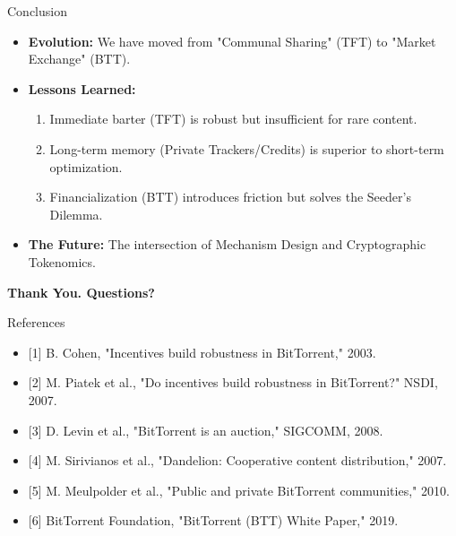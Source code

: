 \documentclass[aspectratio=169]{beamer}
\begin{document}
\begin{frame}{Conclusion}
    \begin{itemize}
        \item \textbf{Evolution:} We have moved from "Communal Sharing" (TFT) to "Market Exchange" (BTT).
        \item \textbf{Lessons Learned:}
        \begin{enumerate}
            \item Immediate barter (TFT) is robust but insufficient for rare content.
            \item Long-term memory (Private Trackers/Credits) is superior to short-term optimization.
            \item Financialization (BTT) introduces friction but solves the Seeder's Dilemma.
        \end{enumerate}
        \item \textbf{The Future:} The intersection of Mechanism Design and Cryptographic Tokenomics.
    \end{itemize}
    
    \vspace{1cm}
    \centering
    \Large \textbf{Thank You. Questions?}
\end{frame}

\begin{frame}[allowframebreaks]{References}
    
    \tiny
    \begin{itemize}
        \item {[1]} B. Cohen, "Incentives build robustness in BitTorrent," 2003.
        \item {[2]} M. Piatek et al., "Do incentives build robustness in BitTorrent?" NSDI, 2007.
        \item {[3]} D. Levin et al., "BitTorrent is an auction," SIGCOMM, 2008.
        \item {[4]} M. Sirivianos et al., "Dandelion: Cooperative content distribution," 2007.
        \item {[5]} M. Meulpolder et al., "Public and private BitTorrent communities," 2010.
        \item {[6]} BitTorrent Foundation, "BitTorrent (BTT) White Paper," 2019.
    \end{itemize}
\end{frame}
\end{document}

